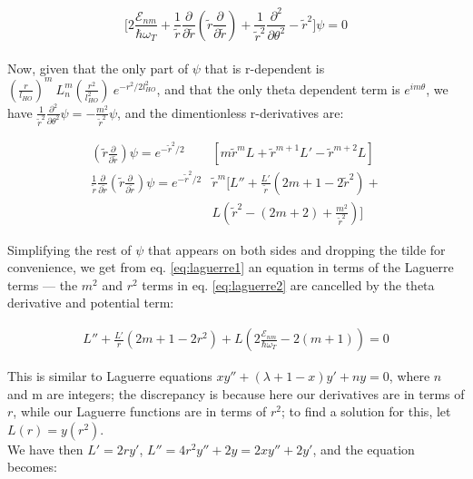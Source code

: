 \documentclass[a4paper,twocolumn,nobalancelastpage]{revtex4-1}
\begin{document}
\begin{equation}
\bigg[ 2 \frac{\mathcal{E}_{nm}}{\hbar \omega_{T}}  + \frac{1}{\tilde{r}} \frac{\partial}{\partial \tilde{r}}\left( \tilde{r} \frac{\partial }{\partial \tilde{r}} \right)+\frac{1}{\tilde{r}^2}\frac{\partial ^2}{\partial \theta^2}  - \tilde{r}^2 \bigg]\psi =0
\end{equation}
\\
Now, given that the only part of $\psi$ that is r-dependent is $\left( \frac{r}{l_{HO}} \right)^m \ L^m_n\left(\frac{r^2}{l^2_{HO}} \right) \ e^{-r^2/2 l_{HO}^2}$, and that the only theta dependent term is $e^{im\theta}$, we have $\frac{1}{\tilde{r}^2}\frac{\partial ^2}{\partial \theta^2}\psi=-\frac{m^2}{\tilde{r}^2}\psi$, and the dimentionless r-derivatives are: 

\begin{align}
\label{eq:laguerre2}
\left( \tilde{r} \frac{\partial }{\partial \tilde{r}} \right) \psi =  e^{-\tilde{r}^2/2}& \left[ m \tilde{r}^m L+ \tilde{r}^{m+1} L' - \tilde{r}^{m+2} L \right] \\
\frac{1}{\tilde{r}}\frac{\partial}{\partial \tilde{r}}\left(\tilde{r} \frac{\partial }{\partial \tilde{r}} \right) \psi =  e^{-\tilde{r}^2/2}& \tilde{r}^m \bigg[ 
L'' + \frac{L'}{\tilde{r}} \left( 2m+1-2\tilde{r}^2 \right) + \nonumber \\
 &L \left( \tilde{r}^2 -(2m+2)+\frac{m^2}{\tilde{r}^2}\right)
 \bigg] 
\end{align}

Simplifying the rest of $\psi$ that appears on both sides and dropping the tilde for convenience, we get from eq. \eqref{eq:laguerre1} an equation in terms of the Laguerre terms --- the $m^2$ and $r^2$ terms in eq. \eqref{eq:laguerre2} are cancelled by the theta derivative and potential term:

\begin{align}
L'' + \frac{L'}{r} \left( 2m+1-2r^2 \right) + 
 L \left(2 \frac{\mathcal{E}_{nm}}{\hbar \omega_{T}} -2(m+1)\right) =0
\end{align}

This is similar to Laguerre equations $xy''+(\lambda+1-x)y'+n y=0$, where $n$ and m are integers; the discrepancy is because here our derivatives are in terms of $r$, while our Laguerre functions are in terms of $r^2$; to find a solution for this, let $L(r)=y(r^2)$.\\

We have then $L'=2ry'$, $L''=4r^2y''+2y=2xy''+2y'$, and the equation becomes:
\end{document}
